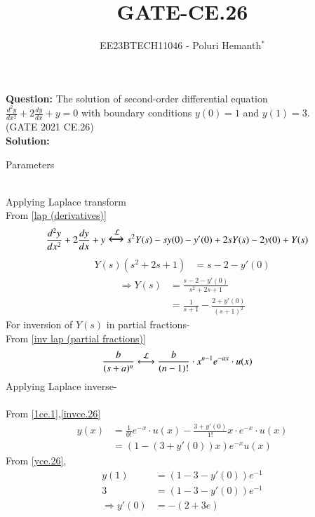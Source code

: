 \documentclass[journal,12pt,twocolumn]{IEEEtran}
\theoremstyle{remark}
\begin{document}

\vspace{3cm}

\title{GATE-CE.26}
\author{EE23BTECH11046 - Poluri Hemanth$^{*}$}
\maketitle
\textbf{Question:}
The solution of second-order differential equation \\ $\frac{d^2y}{dx^2}+2\frac{dy}{dx}+y=0$ with boundary conditions $y(0)=1$ and $y(1)=3$.\\
\hfill{(GATE  2021 CE.26)}\\
\textbf{Solution:}
\fi
\begin{table}[h!]
        
        \caption{Parameters}
        \label{tab:es.47}
\end{table}\\
Applying Laplace transform
\\From \ref{lap (derivatives)}
\begin{align}
	\frac{d^2y}{dx^2}+2\frac{dy}{dx}+y&\Large\xleftrightarrow{\mathcal{L}}s^2Y(s)-sy(0)-y'(0)+2sY(s)-2y(0)+Y(s)
\end{align}
\begin{align}
	Y(s)(s^2+2s+1)&=s-2-y'(0)
\end{align}
\begin{align}
	\Rightarrow Y(s)&=\frac{s-2-y'(0)}{s^2+2s+1}\\
	&=\frac{1}{s+1}-\frac{2+y'(0)}{(s+1)^2}\label{1ce.1}
\end{align}
For inversion of $Y(s)$ in partial fractions-
\\From \ref{inv lap (partial fractions)}
\begin{align}
	&\frac{b}{(s+a)^n}\system{L}\frac{b}{(n-1)!}\cdot x^{n-1} e^{-ax}\cdot u(x)\label{invce.26}
\end{align}
Applying Laplace inverse-\\
\\From \eqref{1ce.1},\eqref{invce.26}
\begin{align}
	y(x)&=\frac{1}{0!} e^{-x}\cdot u(x)-\frac{3+y'(0)}{1!}x\cdot e^{-x}\cdot u(x)\\
	&=(1-(3+y'(0))x)e^{-x}u(x)\label{yce.26}
\end{align}
From \eqref{yce.26},
\begin{align}
	y(1)&=(1-3-y'(0))e^{-1}\\
	3&=(1-3-y'(0))e^{-1}\\
	\Rightarrow y'(0)&=-(2+3e)\label{y'0ce.26}
\end{align}
\end{document}
